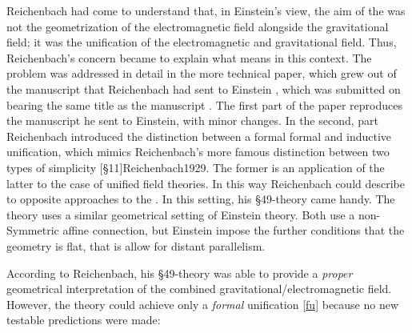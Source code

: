 \documentclass[draft]{article}
\begin{document}
Reichenbach had come to understand that, in Einstein's view, the aim of the \uftp was not the geometrization of the electromagnetic field alongside the gravitational field; it was the unification of the electromagnetic and gravitational field. Thus, Reichenbach's concern became to explain what  means in this context. The problem was addressed in detail in the more technical paper, which grew out of the manuscript that Reichenbach had sent to Einstein \citep{Reichenbach1929a}, which was submitted on  bearing the same title  as the manuscript \citep{Reichenbach1928b}. The first part of the paper reproduces the manuscript he sent to Einstein, with minor changes. In the second, part Reichenbach introduced the distinction between a formal formal and inductive unification, which mimics Reichenbach's more famous distinction between two types of simplicity [\S11]{Reichenbach1929}. The former is an application of the latter to the case of unified field theories. In this way Reichenbach could describe to opposite approaches to the \uftp. In this setting, his \S49-theory came handy. The theory uses a similar geometrical setting of Einstein theory. Both use a non-Symmetric affine connection, but Einstein impose the further conditions that the geometry is flat, that is allow for distant parallelism.

According to Reichenbach, his \S49-theory was able to provide a \emph{proper} geometrical interpretation of the combined gravitational/electromagnetic field. However, the theory could achieve only a \emph{formal} unification \cref{fu} because no new testable predictions were made:
\end{document}
